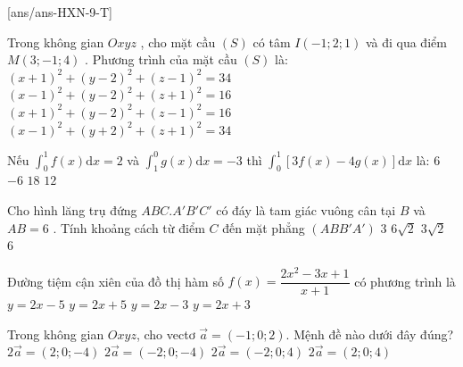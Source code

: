 \def\sode{9}
\begin{name}
	{\tenchude}
	{\tendethi}
	{\tentruong}
	{\thoigian}
\end{name}

\caulc
{}[ans/ans-HXN-\sode-T]

\begin{ex}%
    Trong không gian $Oxyz$ , cho mặt cầu $(S)$ có tâm $I(-1;2;1)$ và đi qua điểm $M(3;-1;4)$ . Phương trình của mặt cầu $(S)$ là:
    \choice
    {\True $(x+1)^2+(y-2)^2+(z-1)^2=34$}
    {$(x-1)^2+(y-2)^2+(z+1)^2=16$}
    {$(x+1)^2+(y-2)^2+(z-1)^2=16$}
    {$(x-1)^2+(y+2)^2+(z+1)^2=34$}
\end{ex}

\begin{ex}%
    Nếu $\mathop{\int}_0^1f(x)\text{d}x=2$ và $\mathop{\int}_1^0g(x)\text{d}x=-3$ thì $\mathop{\int}_0^1[3f(x)-4g(x)]\text{d}x$ là:
    \choice
    {$6$}
    {\True $-6$}
    {$18$}
    {$12$}
\end{ex}

\begin{ex}%
    Cho hình lăng trụ đứng $ABC.A' B' C'$ có đáy là tam giác vuông cân tại $B$ và $AB=6$ . Tính khoảng cách từ điểm $C$ đến mặt phẳng $(ABB'A')$
    \choice
    {$3$}
    {$6\sqrt{2}$}
    {$3\sqrt{2}$}
    {\True $6$}
\end{ex}

\begin{ex}%
Đường tiệm cận xiên của đồ thị hàm số $ f(x)=\dfrac{2x^2-3x+1}{x+1}$ có phương trình là
\choice
{\True $y=2x-5$}
{$y=2x+5$}
{$y=2x-3$}
{$y=2x+3$}
\end{ex}

\begin{ex}%
Trong không gian $ Oxyz$, cho vectơ $\vec{a}=(-1;0;2)$. Mệnh đề nào dưới đây đúng?
\choice
{$2\vec{a}=(2;0;-4)$}
{$2\vec{a}=(-2;0;-4)$}
{\True $2\vec{a}=(-2;0;4)$}
{$2\vec{a}=(2;0;4)$}
\end{ex}

